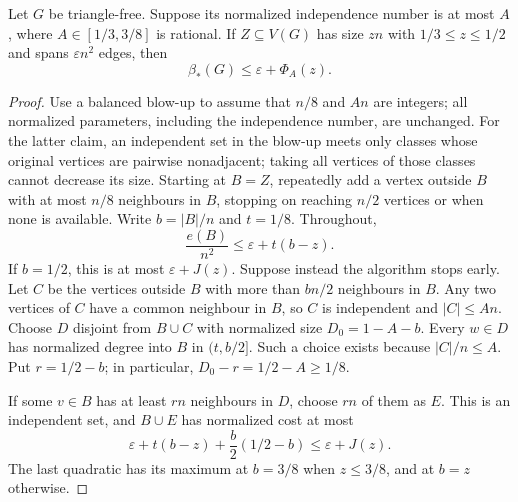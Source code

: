 \documentclass[12pt]{article}
\newcommand{\B}{\beta_*}
\begin{document}
\begin{lemma}\label{lem:extension}
Let $G$ be triangle-free. Suppose its normalized independence number is at most $A$,
where $A\in[1/3,3/8]$ is rational. If $Z\subseteq V(G)$ has size $zn$
with $1/3\le z\le1/2$ and spans $\varepsilon n^2$ edges, then
\[
 \B(G)\le\varepsilon+\Phi_A(z).
\]
\end{lemma}
\begin{proof}
Use a balanced blow-up to assume that $n/8$ and $An$ are integers;
all normalized parameters, including the independence number, are
unchanged. For the latter claim, an independent set in the blow-up meets
only classes whose original vertices are pairwise nonadjacent; taking
all vertices of those classes cannot decrease its size.
Starting at $B=Z$, repeatedly add a vertex outside $B$ with
at most $n/8$ neighbours in $B$, stopping on reaching $n/2$ vertices or
when none is available. Write $b=|B|/n$ and $t=1/8$. Throughout,
\[
 \frac{e(B)}{n^2}\le\varepsilon+t(b-z).
\]
If $b=1/2$, this is at most $\varepsilon+J(z)$. Suppose instead the
algorithm stops early. Let $C$ be the vertices outside $B$ with more
than $bn/2$ neighbours in $B$. Any two vertices of $C$ have a common
neighbour in $B$, so $C$ is independent and $|C|\le An$.
Choose $D$ disjoint from $B\cup C$ with normalized size
$D_0=1-A-b$. Every $w\in D$ has normalized degree into $B$ in
$(t,b/2]$. Such a choice exists because $|C|/n\le A$.
Put $r=1/2-b$; in particular, $D_0-r=1/2-A\ge1/8$.

If some $v\in B$ has at least $rn$ neighbours in $D$, choose $rn$ of
them as $E$. This is an independent set, and $B\cup E$ has normalized
cost at most
\[
 \varepsilon+t(b-z)+\frac b2(1/2-b)\le\varepsilon+J(z).
\]
The last quadratic has its maximum at $b=3/8$ when $z\le3/8$,
and at $b=z$ otherwise.


\end{proof}
\end{document}
